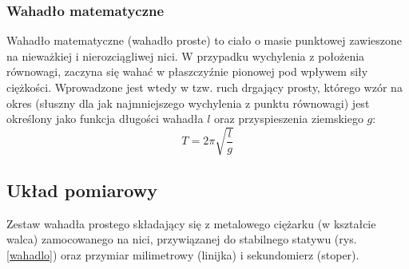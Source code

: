 \documentclass[a4paper,12pts]{article}
\begin{document}
			\subsubsection{Wahadło matematyczne}
			Wahadło matematyczne (wahadło proste) to ciało o masie punktowej zawieszone na nieważkiej i nierozciągliwej nici. W przypadku wychylenia z położenia równowagi, zaczyna się wahać w płaszczyźnie pionowej pod wpływem siły ciężkości. Wprowadzone jest wtedy w tzw. ruch drgający prosty, którego wzór na okres (słuszny dla jak najmniejszego wychylenia z punktu równowagi) jest określony jako funkcja długości wahadła $l$ oraz przyspieszenia ziemskiego $g$:
			\begin{equation}
				T = 2 \pi \sqrt{\frac{l}{g}}
			\end{equation}
	
		\subsection{Układ pomiarowy}	
		Zestaw wahadła prostego składający się z metalowego ciężarku (w kształcie walca) zamocowanego na nici, przywiązanej do stabilnego statywu (rys. \ref{wahadlo}) oraz przymiar milimetrowy (linijka) i sekundomierz (stoper). 
		
\end{document}
